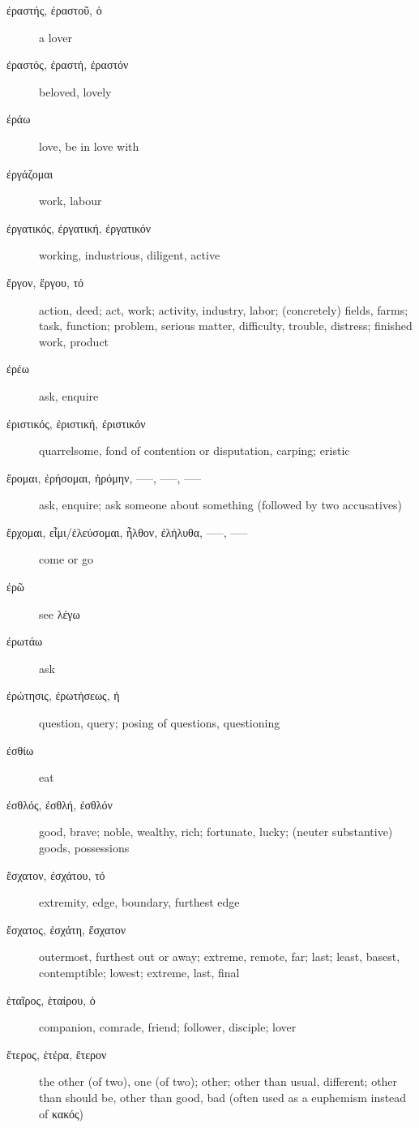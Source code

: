 \documentclass[12pt,letterpaper]{article}
\begin{document}
\begin{description}
    \item[\textgreek{ἐραστής, ἐραστοῦ, ὁ}] a lover
    \item[\textgreek{ἐραστός, ἐραστή, ἐραστόν}] beloved, lovely
    \item[\textgreek{ἐράω}] love, be in love with
    \item[\textgreek{ἐργάζομαι}] work, labour
    \item[\textgreek{ἐργατικός, ἐργατική, ἐργατικόν}] working, industrious, diligent, active
    \item[\textgreek{ἔργον, ἔργου, τό}] \marginnote{*}action, deed; act, work; activity, industry, labor; (concretely) fields, farms; task, function; problem, serious matter, difficulty, trouble, distress; finished work, product
    \item[\textgreek{ἐρέω}] ask, enquire
    \item[\textgreek{ἐριστικός, ἐριστική, ἐριστικόν}] quarrelsome, fond of contention or disputation, carping; eristic
    \item[\textgreek{ἔρομαι, ἐρήσομαι, ἠρόμην, –––, –––, –––}] \marginnote{*}ask, enquire; ask someone about something (followed by two accusatives)
    \item[\textgreek{ἔρχομαι, εἶμι/ἐλεύσομαι, ἦλθον, ἐλήλυθα, –––, –––}] \marginnote{*}come or go
    \item[\textgreek{ἐρῶ}] see \textgreek{λέγω}
    \item[\textgreek{ἐρωτάω}] ask
    \item[\textgreek{ἐρώτησις, ἐρωτήσεως, ἡ}] question, query; posing of questions, questioning
    \item[\textgreek{ἐσθίω}] eat
    \item[\textgreek{ἐσθλός, ἐσθλή, ἐσθλόν}] good, brave; noble, wealthy, rich; fortunate, lucky; (neuter substantive) goods, possessions
    \item[\textgreek{ἔσχατον, ἐσχάτου, τό}] extremity, edge, boundary, furthest edge
    \item[\textgreek{ἔσχατος, ἐσχάτη, ἔσχατον}] outermost, furthest out or away; extreme, remote, far; last; least, basest, contemptible; lowest; extreme, last, final
    \item[\textgreek{ἑταῖρος, ἑταίρου, ὁ}] \marginnote{*}companion, comrade, friend; follower, disciple; lover
    \item[\textgreek{ἕτερος, ἑτέρα, ἕτερον}] \marginnote{*}the other (of two), one (of two); other; other than usual, different; other than should be, other than good, bad (often used as a euphemism instead of \textgreek{κακός})

\end{description}
\end{document}
